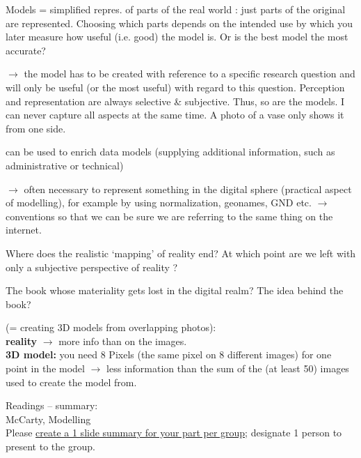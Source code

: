 \begin{frame}[allowframebreaks]{Models = simplified repres. of parts of the real world }
: just parts of the original are represented. Choosing which parts depends on the intended use by which you later measure how useful (i.e. good) the model is. Or is the best model the most accurate? 

 $\to$ the model has to be created with reference to a specific research question and will only be useful (or the most useful) with regard to this question. Perception and representation are always selective \& subjective. Thus, so are the models. I can never capture all aspects at the same time. A photo of a vase only shows it from one side. 

 can be used to enrich data models (supplying additional information, such as administrative or technical) 

 $\to$ often necessary to represent something in the digital sphere (practical aspect of modelling), for example by using normalization, geonames, GND etc. $\to$ conventions so that we can be sure we are referring to the same thing on the internet.
\medskip

Where does the realistic `mapping' of reality end? At which point are we left with only a subjective perspective of reality ?

\framebreak

 The book whose materiality gets lost in the digital realm? The idea behind the book?
\smallskip


 (= creating 3D models from overlapping photos): \\
 \textbf{reality} $\to$ more info than on the images. \\
 \textbf{3D model:} you need 8 Pixels (the same pixel on 8 different images) for one point in the model $\to$ less information than the sum of the (at least 50) images used to create the model from. 
\end{frame}

\begin{frame}[standout]
    \alert{Readings} -- summary: \\
    McCarty, Modelling \\[1em]
    {\footnotesize Please \alert{\href{https://docs.google.com/presentation/d/1YrEMpuguN12pY02jj_RKidxV9G88WTt5cCtUQldCe8w/edit?usp=sharing}{create a 1 slide summary for your part per group}}; designate 1 person to present to the group. \\
    }
\end{frame}
